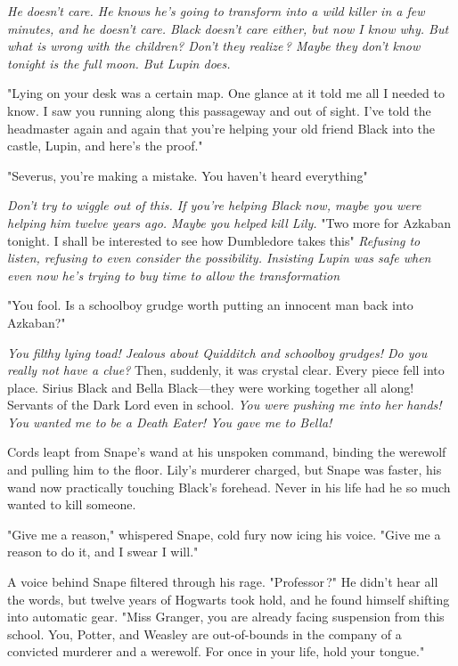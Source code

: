 \emph{He doesn't care. He knows he's going to transform into a wild killer in a few minutes, and he doesn't care. Black doesn't care either, but now I know why. But what is wrong with the children? Don't they realize{\el}\,? Maybe they don't know tonight is the full moon. But Lupin does.}

"Lying on your desk was a certain map. One glance at it told me all I needed to know. I saw you running along this passageway and out of sight. I've told the headmaster again and again that you're helping your old friend Black into the castle, Lupin, and here's the proof."

"Severus, you're making a mistake. You haven't heard everything{\el}"

\emph{Don't try to wiggle out of this. If you're helping Black now, maybe you were helping him twelve years ago. Maybe you helped kill Lily.} "Two more for Azkaban tonight. I shall be interested to see how Dumbledore takes this{\el}" \emph{Refusing to listen, refusing to even consider the possibility. Insisting Lupin was safe when even now he's trying to buy time to allow the transformation{\el}}

"You fool. Is a schoolboy grudge worth putting an innocent man back into Azkaban?"

\emph{You filthy lying toad! Jealous about Quidditch and schoolboy grudges! Do you really not have a clue?} Then, suddenly, it was crystal clear. Every piece fell into place. Sirius Black and Bella Black—they were working together all along! Servants of the Dark Lord even in school. \emph{You were pushing me into her hands! You wanted me to be a Death Eater! You gave me to Bella!}

Cords leapt from Snape's wand at his unspoken command, binding the werewolf and pulling him to the floor. Lily's murderer charged, but Snape was faster, his wand now practically touching Black's forehead. Never in his life had he so much wanted to kill someone.

"Give me a reason," whispered Snape, cold fury now icing his voice. "Give me a reason to do it, and I swear I will."

A voice behind Snape filtered through his rage. "Professor{\el}\,?" He didn't hear all the words, but twelve years of Hogwarts took hold, and he found himself shifting into automatic gear. "Miss Granger, you are already facing suspension from this school. You, Potter, and Weasley are out-of-bounds in the company of a convicted murderer and a werewolf. For once in your life, hold your tongue."


